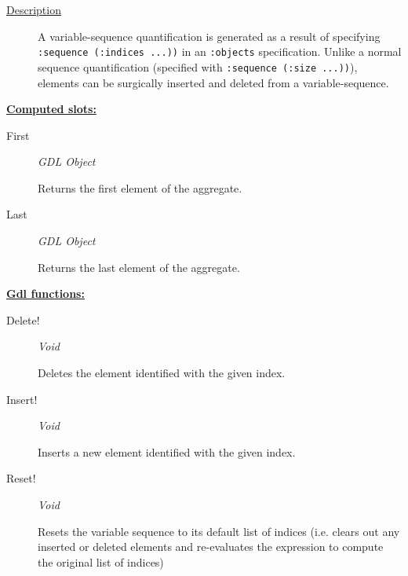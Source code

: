 \documentclass [11pt]{book}
\begin{document}
\begin{itemize}
\begin{description}
\item [
\underline{Description}]


A variable-sequence quantification is generated as a result of specifying 
\texttt{:sequence (:indices ...))} in an \texttt{:objects} specification. Unlike a normal sequence quantification (specified
with \texttt{:sequence (:size ...))}), elements can be surgically inserted and deleted from a variable-sequence.



\end{description}








\textbf{
\underline{Computed slots:}}

\begin{description}

\item [First]
\emph{GDL Object}

 Returns the first element of the aggregate.




\item [Last]
\emph{GDL Object}

 Returns the last element of the aggregate.




\end{description}






\textbf{
\underline{Gdl functions:}}

\begin{description}

\item [Delete!]
\emph{Void}

 Deletes the element identified with the given index.




\item [Insert!]
\emph{Void}

 Inserts a new element identified with the given index.




\item [Reset!]
\emph{Void}

 Resets the variable sequence to its default list of indices (i.e. clears out any inserted or deleted elements and
re-evaluates the expression to compute the original list of indices)




\end{description}







\end{itemize}
\end{document}
